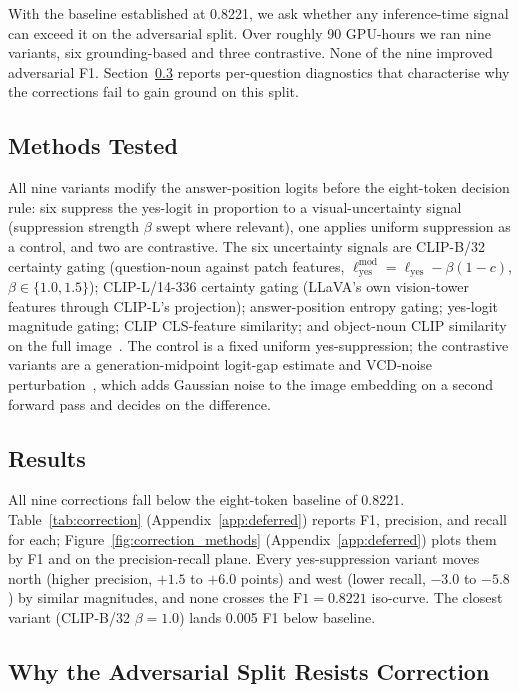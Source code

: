 \documentclass{article}
\begin{document}
With the baseline established at 0.8221, we ask whether any
inference-time signal can exceed it on the adversarial split. Over
roughly 90 GPU-hours we ran nine variants, six grounding-based and
three contrastive. None of the nine improved adversarial F1.
Section~\ref{sec:why} reports per-question diagnostics that
characterise why the corrections fail to gain ground on this split.

\subsection{Methods Tested}

All nine variants modify the answer-position logits before the
eight-token decision rule: six suppress the yes-logit in proportion to a
visual-uncertainty signal (suppression strength $\beta$ swept where
relevant), one applies uniform suppression as a control, and two are
contrastive. The six uncertainty signals are CLIP-B/32 certainty gating
(question-noun against patch features, $\ell_{\text{yes}}^{\text{mod}} =
\ell_{\text{yes}} - \beta(1-c)$, $\beta \in \{1.0, 1.5\}$);
CLIP-L/14-336 certainty gating (LLaVA's own vision-tower features through
CLIP-L's projection); answer-position entropy gating; yes-logit
magnitude gating; CLIP CLS-feature similarity; and object-noun CLIP
similarity on the full image~\citep{radford2021learning}. The control is
a fixed uniform yes-suppression; the contrastive variants are a
generation-midpoint logit-gap estimate and VCD-noise
perturbation~\citep{leng2024mitigating}, which adds Gaussian noise to the
image embedding on a second forward pass and decides on the difference.

\subsection{Results}

All nine corrections fall below the eight-token baseline of 0.8221.
Table~\ref{tab:correction} (Appendix~\ref{app:deferred}) reports F1,
precision, and recall for each; Figure~\ref{fig:correction_methods}
(Appendix~\ref{app:deferred}) plots them by F1 and on the
precision-recall plane. Every yes-suppression variant moves north
(higher precision, $+1.5$ to $+6.0$ points) and west (lower recall,
$-3.0$ to $-5.8$) by similar magnitudes, and none crosses the
$\mathrm{F1}{=}0.8221$ iso-curve. The closest variant (CLIP-B/32
$\beta{=}1.0$) lands 0.005 F1 below baseline.

\subsection{Why the Adversarial Split Resists Correction}
\label{sec:why}
\label{sec:whyfails}
\end{document}
